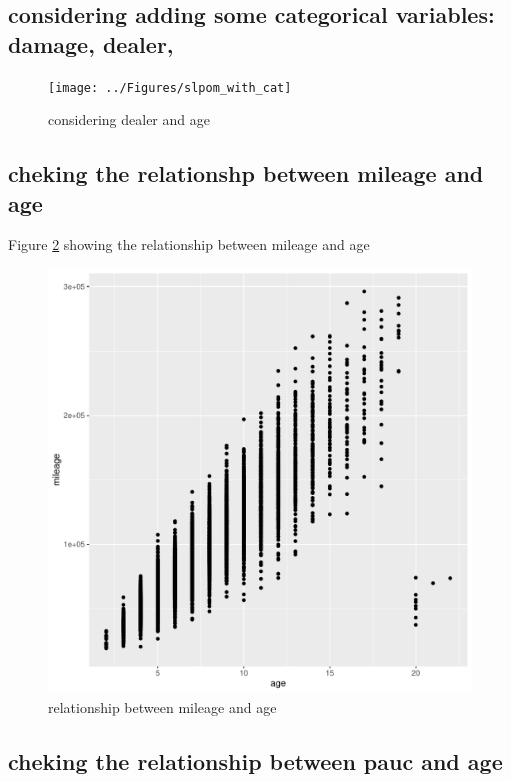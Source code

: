 \documentclass[11pt]{paper}
\begin{document}
\subsection{considering adding some categorical variables: damage, dealer, }

\begin{figure}[h!]
  \centering
  \texttt{[image: ../Figures/slpom\_with\_cat]}
  \caption{considering dealer and age} \label{fig:splom_with_cat}
\end{figure}
\clearpage

\subsection{cheking the relationshp between mileage and age }

Figure \ref{fig:age_mileage_plot} showing the relationship between mileage and age 

\begin{figure}[h!]
  \centering
  \includegraphics[scale = 0.5, keepaspectratio=true]{../Figures/age_mileage_plot}
  \caption{relationship between mileage and age} \label{fig:age_mileage_plot}
\end{figure}

\pagebreak
\subsection{cheking the relationship between pauc and age }
\end{document}
